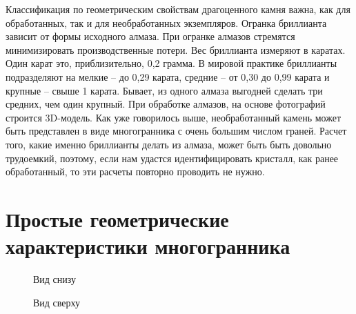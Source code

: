 \documentclass[a4paper,12pt, titlepage]{article}
\begin{document}
Классификация по геометрическим свойствам драгоценного камня важна, как для обработанных, так и для необработанных экземпляров.
Огранка бриллианта зависит от формы исходного алмаза. При огранке алмазов стремятся минимизировать производственные потери. Вес 
бриллианта измеряют в каратах. Один карат это, приблизительно, 0,2 грамма. 
В мировой практике бриллианты подразделяют на мелкие -- до 0,29 
карата,  средние -- от 0,30 до 0,99 карата и крупные -- свыше 1 карата. Бывает, из одного алмаза выгодней сделать три средних, 
чем один крупный. При обработке алмазов, на основе фотографий строится 3D-модель. Как уже говорилось выше, необработанный камень 
может быть представлен в виде многогранника с очень большим числом граней. Расчет того, какие именно бриллианты делать из алмаза, 
может быть быть довольно трудоемкий, поэтому, если нам удастся идентифицировать кристалл, как ранее обработанный, то эти расчеты 
повторно проводить не нужно.  


\newpage
\section{Простые геометрические характеристики многогранника}

\begin{figure}[h]
\noindent
\begin{multicols}{2}
\noindent{}		
	\caption{Вид снизу}
	\label{brill_z_minus}

\noindent{}		
	\caption{Вид сверху}
	\label{brill_z_plus}
\end{multicols}
\end{figure}
\end{document}
